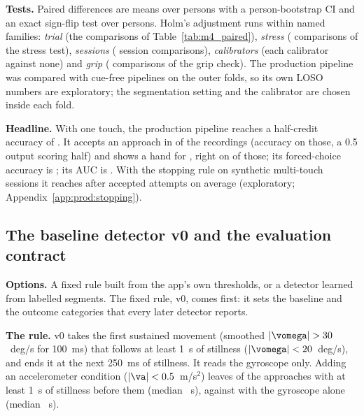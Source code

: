 \textbf{Tests.}
Paired differences are means over persons with a person-bootstrap CI and an exact sign-flip test over persons.
Holm's adjustment runs within named families: \emph{trial} (the  comparisons of Table~\ref{tab:m4_paired}), \emph{stress} ( comparisons of the stress test), \emph{sessions} ( session comparisons), \emph{calibrators} (each calibrator against none) and \emph{grip} ( comparisons of the grip check).
The production pipeline was compared with  cue-free pipelines on the outer folds, so its own LOSO numbers are exploratory; the segmentation setting and the calibrator are chosen inside each fold.

\textbf{Headline.}
With one touch, the production pipeline reaches a half-credit accuracy of . It accepts an approach in  of the recordings (accuracy  on those, a 0.5 output scoring half) and shows a hand for , right on  of those; its forced-choice accuracy is ; its AUC is .
With the stopping rule on synthetic multi-touch sessions it reaches  after  accepted attempts on average (exploratory; Appendix~\ref{app:prod:stopping}).

\subsection{The baseline detector v0 and the evaluation contract}\label{app:prod:v0}

\textbf{Options.}
A fixed rule built from the app's own thresholds, or a detector learned from labelled segments.
The fixed rule, v0, comes first: it sets the baseline and the outcome categories that every later detector reports.

\textbf{The rule.}
v0 takes the first sustained movement (smoothed $|\vomega| > 30$~deg/s for 100~ms) that follows at least 1~s of stillness ($|\vomega| < 20$~deg/s), and ends it at the next 250~ms of stillness.
It reads the gyroscope only.
Adding an accelerometer condition ($|\va| < 0.5$~m/s$^2$) leaves  of the approaches with at least 1~s of stillness before them (median ~s), against  with the gyroscope alone (median ~s).

